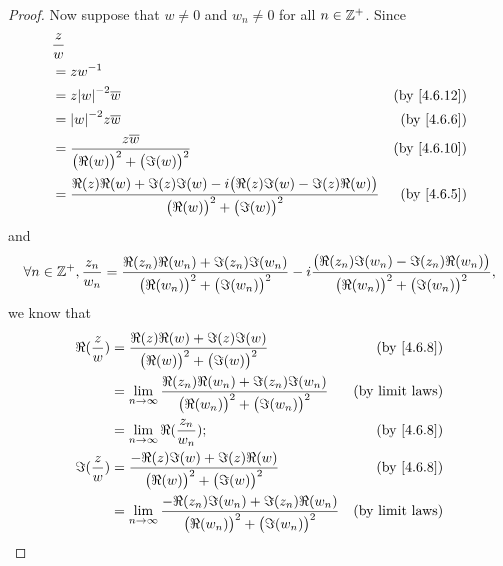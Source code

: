 \begin{proof}
  Now suppose that \(w \neq 0\) and \(w_n \neq 0\) for all \(n \in \mathbb{Z}^+\).
  Since
  \begin{align*}
     & \frac{z}{w}                                                                                                                                             \\
     & = z w^{-1}                                                                                                                                              \\
     & = z \abs{w}^{-2} \overline{w}                                                                                               & \text{(by \cref{4.6.12})} \\
     & = \abs{w}^{-2} z \overline{w}                                                                                               & \text{(by \cref{4.6.6})}  \\
     & = \frac{z \overline{w}}{\big(\Re(w)\big)^2 + \big(\Im(w)\big)^2}                                                            & \text{(by \cref{4.6.10})} \\
     & = \frac{\Re(z) \Re(w) + \Im(z) \Im(w) - i \big(\Re(z) \Im(w) - \Im(z) \Re(w)\big)}{\big(\Re(w)\big)^2 + \big(\Im(w)\big)^2} & \text{(by \cref{4.6.5})}
  \end{align*}
  and
  \[
    \forall n \in \mathbb{Z}^+, \frac{z_n}{w_n} = \frac{\Re(z_n) \Re(w_n) + \Im(z_n) \Im(w_n)}{\big(\Re(w_n)\big)^2 + \big(\Im(w_n)\big)^2} - i \frac{\big(\Re(z_n) \Im(w_n) - \Im(z_n) \Re(w_n)\big)}{\big(\Re(w_n)\big)^2 + \big(\Im(w_n)\big)^2},
  \]
  we know that
  \begin{align*}
    \Re(\frac{z}{w}) & = \frac{\Re(z) \Re(w) + \Im(z) \Im(w)}{\big(\Re(w)\big)^2 + \big(\Im(w)\big)^2}                                   & \text{(by \cref{4.6.8})} \\
                     & = \lim_{n \to \infty} \frac{\Re(z_n) \Re(w_n) + \Im(z_n) \Im(w_n)}{\big(\Re(w_n)\big)^2 + \big(\Im(w_n)\big)^2}   & \text{(by limit laws)}   \\
                     & = \lim_{n \to \infty} \Re(\frac{z_n}{w_n});                                                                       & \text{(by \cref{4.6.8})} \\
    \Im(\frac{z}{w}) & = \frac{- \Re(z) \Im(w) + \Im(z) \Re(w)}{\big(\Re(w)\big)^2 + \big(\Im(w)\big)^2}                                 & \text{(by \cref{4.6.8})} \\
                     & = \lim_{n \to \infty} \frac{- \Re(z_n) \Im(w_n) + \Im(z_n) \Re(w_n)}{\big(\Re(w_n)\big)^2 + \big(\Im(w_n)\big)^2} & \text{(by limit laws)}   \\

\end{align*}
\end{proof}
